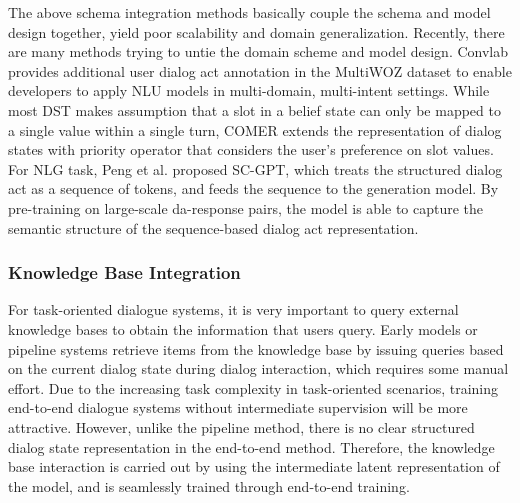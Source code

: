 \documentclass[10pt,twocolumn,letterpaper]{article}
\begin{document}
The above schema integration methods basically couple the schema and model design together,  yield poor scalability  and  domain  generalization. Recently, there are  many methods trying to untie the domain scheme and model design. Convlab  \cite{lee2019convlab}  provides  additional  user  dialog  act  annotation in the MultiWOZ \cite{budzianowski2018multiwoz}dataset to enable developers to apply NLU models in multi-domain, multi-intent settings. While most DST makes assumption that a slot in a belief state can only be mapped to a single value within a single turn, COMER \cite{ren2020scalable}extends the representation of dialog states with priority operator that considers the user’s preference on slot values. For NLG  task,  Peng  et  al.   \cite{peng2020few} proposed  SC-GPT,  which treats the structured dialog act as a sequence of tokens, and feeds the sequence to the generation model.  By pre-training on large-scale da-response pairs, the model is able to capture the semantic structure of the sequence-based dialog act representation.
\subsubsection{Knowledge Base Integration}

For task-oriented dialogue systems, it is very important to query external knowledge bases to obtain the information that users query. Early models or pipeline systems retrieve items from the knowledge base by issuing queries based on the current dialog state during dialog interaction, which requires some manual effort. Due to the increasing task complexity in task-oriented scenarios, training end-to-end dialogue systems without intermediate supervision will be more attractive. However, unlike the pipeline method, there is no clear structured dialog state representation in the end-to-end method. Therefore, the knowledge base interaction is carried out by using the intermediate latent representation of the model, and is seamlessly trained through end-to-end training.
\end{document}
